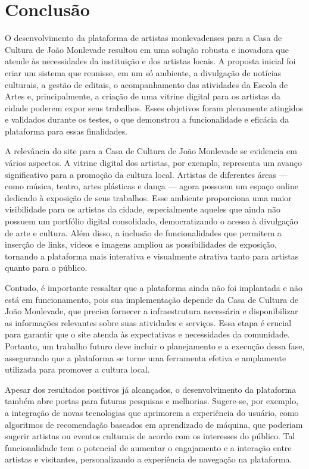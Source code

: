 \chapter[Conclusão]{Conclusão}

O desenvolvimento da plataforma de artistas monlevadenses para a Casa de Cultura de João Monlevade resultou em uma solução robusta e inovadora que atende às necessidades da instituição e dos artistas locais. A proposta inicial foi criar um sistema que reunisse, em um só ambiente, a divulgação de notícias culturais, a gestão de editais, o acompanhamento das atividades da Escola de Artes e, principalmente, a criação de uma vitrine digital para os artistas da cidade poderem expor seus trabalhos. Esses objetivos foram plenamente atingidos e validados durante os testes, o que demonstrou a funcionalidade e eficácia da plataforma para essas finalidades.

A relevância do site para a Casa de Cultura de João Monlevade se evidencia em vários aspectos. A vitrine digital dos artistas, por exemplo, representa um avanço significativo para a promoção da cultura local. Artistas de diferentes áreas — como música, teatro, artes plásticas e dança — agora possuem um espaço online dedicado à exposição de seus trabalhos. Esse ambiente proporciona uma maior visibilidade para os artistas da cidade, especialmente aqueles que ainda não possuem um portfólio digital consolidado, democratizando o acesso à divulgação de arte e cultura. Além disso, a inclusão de funcionalidades que permitem a inserção de links, vídeos e imagens ampliou as possibilidades de exposição, tornando a plataforma mais interativa e visualmente atrativa tanto para artistas quanto para o público.

Contudo, é importante ressaltar que a plataforma ainda não foi implantada e não está em funcionamento, pois sua implementação depende da Casa de Cultura de João Monlevade, que precisa fornecer a infraestrutura necessária e disponibilizar as informações relevantes sobre suas atividades e serviços. Essa etapa é crucial para garantir que o site atenda às expectativas e necessidades da comunidade. Portanto, um trabalho futuro deve incluir o planejamento e a execução dessa fase, assegurando que a plataforma se torne uma ferramenta efetiva e amplamente utilizada para promover a cultura local.

Apesar dos resultados positivos já alcançados, o desenvolvimento da plataforma também abre portas para futuras pesquisas e melhorias. Sugere-se, por exemplo, a integração de novas tecnologias que aprimorem a experiência do usuário, como algoritmos de recomendação baseados em aprendizado de máquina, que poderiam sugerir artistas ou eventos culturais de acordo com os interesses do público. Tal funcionalidade tem o potencial de aumentar o engajamento e a interação entre artistas e visitantes, personalizando a experiência de navegação na plataforma.

